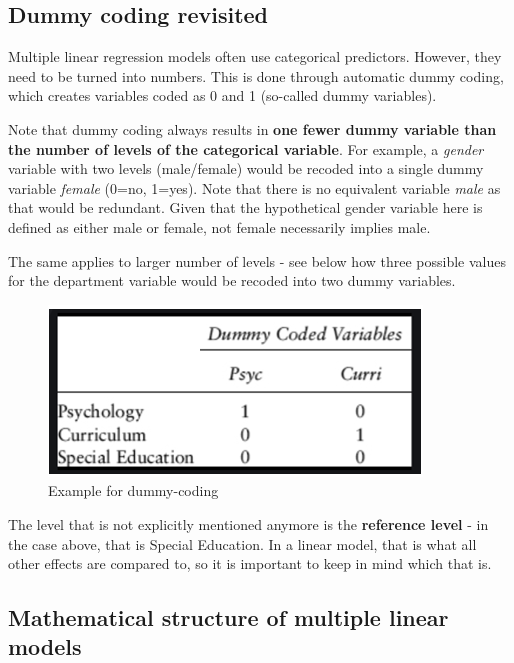 \documentclass[
]{book}
\begin{document}
\hypertarget{dummy-coding-revisited}{%
\subsection{Dummy coding revisited}\label{dummy-coding-revisited}}

Multiple linear regression models often use categorical predictors.
However, they need to be turned into numbers. This is done through
automatic dummy coding, which creates variables coded as 0 and 1
(so-called dummy variables).

Note that dummy coding always results in \textbf{one fewer dummy variable than
the number of levels of the categorical variable}. For example, a
\emph{gender} variable with two levels (male/female) would be recoded into a
single dummy variable \emph{female} (0=no, 1=yes). Note that there is no
equivalent variable \emph{male} as that would be redundant. Given that the
hypothetical gender variable here is defined as either male or female,
not female necessarily implies male.

The same applies to larger number of levels - see below how three
possible values for the department variable would be recoded into two
dummy variables.

\begin{figure}

{\centering \includegraphics[width=1\linewidth]{./images/W10Dummy} 

}

\caption{Example for dummy-coding}\label{fig:img-dummy-coding}
\end{figure}

The level that is not explicitly mentioned anymore is the \textbf{reference
level} - in the case above, that is Special Education. In a linear
model, that is what all other effects are compared to, so it is
important to keep in mind which that is.

\hypertarget{mathematical-structure-of-multiple-linear-models}{%
\subsection{Mathematical structure of multiple linear models}\label{mathematical-structure-of-multiple-linear-models}}
\end{document}
